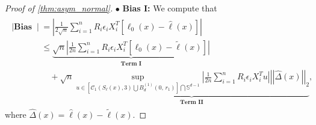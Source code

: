 \documentclass[ejsv2,noshowframe]{imsart}
\theoremstyle{plain}
\theoremstyle{definition}
\theoremstyle{remark}
\newcommand{\norm}[1]{\left|\left| #1 \right|\right|}
\renewcommand{\hat}{\widehat}
\renewcommand{\tilde}{\widetilde}
\begin{document}
\begin{proof}[Proof of \autoref{thm:asym_normal}]
	
	\noindent$\bullet$ \textbf{Bias I:} We compute that
	\begin{align}
		\label{bias_I}
		\begin{split}
			\left|\textbf{Bias I}\right| &=\left|\frac{1}{2\sqrt{n}} \sum_{i=1}^n R_i\epsilon_i X_i^T\left[\ell_0(x) - \hat{\ell}(x)\right]\right|\\
			&\leq \underbrace{\sqrt{n} \left|\frac{1}{2n} \sum_{i=1}^n R_i\epsilon_i X_i^T\left[\ell_0(x) - \tilde{\ell}(x)\right]\right|}_{\textbf{Term I}}\\
			&\quad +\sqrt{n} \underbrace{\sup_{u \in \left[\mathcal{C}_1(S_{\ell}(x),3) \bigcup B_d^{(1)}\left(0,\, r_1\right)\right] \bigcap \mathbb{S}^{d-1}} \left|\frac{1}{2n} \sum_{i=1}^n R_i\epsilon_i X_i^T u \right|\norm{ \hat{\Delta}(x)}_2}_{\textbf{Term II}},
		\end{split}
	\end{align}
	where $\hat{\Delta}(x) = \hat{\ell}(x) -\tilde{\ell}(x)$. 
	

\end{proof}
\end{document}
